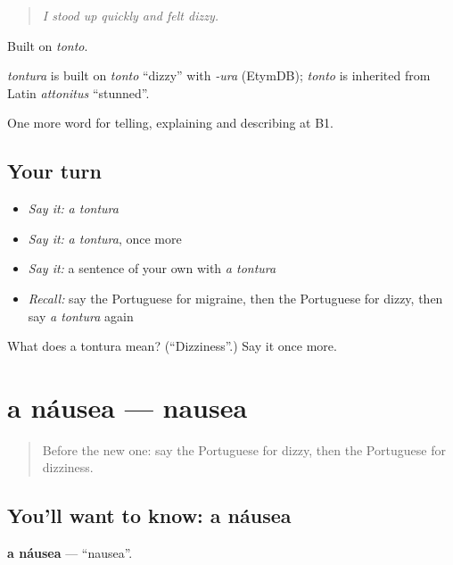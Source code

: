 \begin{quote}
\emph{I stood up quickly and felt dizzy.}
\end{quote}

Built on \emph{tonto}.

\begin{cousinweb}
\emph{tontura} is built on \emph{tonto} \textquotedblleft{}dizzy\textquotedblright{} with \emph{-ura} (EtymDB); \emph{tonto} is inherited from Latin \emph{attonitus} \textquotedblleft{}stunned\textquotedblright{}.
\end{cousinweb}

\begin{grammarlens}[title={What you've built}]
One more word for telling, explaining and describing at B1.
\end{grammarlens}

\subsection*{Your turn}
\begin{itemize}
\raggedright
  \item \emph{Say it:} \emph{a tontura}
  \item \emph{Say it:} \emph{a tontura}, once more
  \item \emph{Say it:} a sentence of your own with \emph{a tontura}
  \item \emph{Recall:} say the Portuguese for migraine, then the Portuguese for dizzy, then say \emph{a tontura} again
\end{itemize}

\begin{tcolorbox}[breakable,colback=teal!4,colframe=teal!35!black,title={Before you move on}]
What does a tontura mean? (\textquotedblleft{}Dizziness\textquotedblright{}.) Say it once more.
\end{tcolorbox}
\section[a náusea]{a náusea — nausea}

\label{lesson:PT-C484-nausea}



\begin{quote}
Before the new one: say the Portuguese for dizzy, then the Portuguese for dizziness.
\end{quote}

\subsection*{You'll want to know: a náusea}
\textbf{a náusea} — \textquotedblleft{}nausea\textquotedblright{}.

